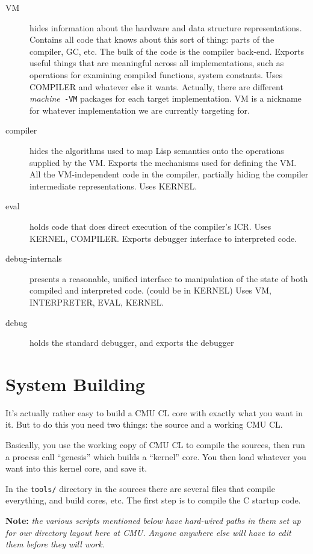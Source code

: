 \begin{description}
\item[VM] hides information about the hardware and data structure
representations.  Contains all code that knows about this sort of thing: parts
of the compiler, GC, etc.  The bulk of the code is the compiler back-end.
Exports useful things that are meaningful across all implementations, such as
operations for examining compiled functions, system constants.  Uses COMPILER
and whatever else it wants.  Actually, there are different {\it machine}{\tt
-VM} packages for each target implementation.  VM is a nickname for whatever
implementation we are currently targeting for.


\item[compiler] hides the algorithms used to map Lisp semantics onto the
operations supplied by the VM.  Exports the mechanisms used for defining the
VM.  All the VM-independent code in the compiler, partially hiding the compiler
intermediate representations.  Uses KERNEL.

\item[eval] holds code that does direct execution of the compiler's ICR.  Uses
KERNEL, COMPILER.  Exports debugger interface to interpreted code.

\item[debug-internals] presents a reasonable, unified interface to
manipulation of the state of both compiled and interpreted code.  (could be in
KERNEL) Uses VM, INTERPRETER, EVAL, KERNEL.

\item[debug] holds the standard debugger, and exports the debugger 
\end{description}

\chapter{System Building}

It's actually rather easy to build a CMU CL core with exactly what you want in
it.  But to do this you need two things: the source and a working CMU CL.

Basically, you use the working copy of CMU CL to compile the sources,
then run a process call ``genesis'' which builds a ``kernel'' core.
You then load whatever you want into this kernel core, and save it.

In the \verb|tools/| directory in the sources there are several files that
compile everything, and build cores, etc.  The first step is to compile the C
startup code.

{\bf Note:} {\it the various scripts mentioned below have hard-wired paths in
them set up for our directory layout here at CMU.  Anyone anywhere else will
have to edit them before they will work.}

